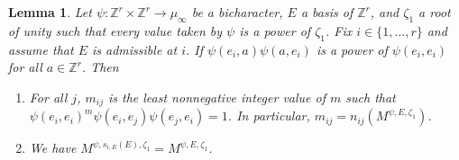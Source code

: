 \documentclass[11pt,letterpaper]{article}
\newtheorem{lemma}[theorem]{Lemma}
\theoremstyle{definition}
\theoremstyle{remark}
\numberwithin{equation}{section}
\theoremstyle{dotless}
\newcommand{\hchi}{\psi} %
\newcommand{\gene}{\zeta_1} %
\begin{document}
\begin{lemma}\label{kubota-bicharacter-identity} Let $\psi\colon \mathbb Z^r \times \mathbb Z^r \to \mu_\infty$ be a bicharacter, $E$ a basis of $\mathbb Z^r$, and $\gene$ a root of unity such that every value taken by $\psi$ is a power of $\gene$. Fix $i \in \{1,\dots, r\}$ and assume that $E$ is admissible at $i$.  If $\psi(e_i,a) \psi(a,e_i)$ is a power of $\psi(e_i,e_i)$ for all $a\in \mathbb Z^r$. Then

\begin{enumerate}
    \item  For all $j$, $m_{ij}$ is the least nonnegative integer value of $m$ such that $\hchi(e_i,e_i)^m \hchi(e_i,e_j) \hchi(e_j,e_i) =1$. In particular, $m_{ij}=n_{ij}(M^{\hchi, E, \gene})$.

    \item We have $M^{\hchi,s_{i,E}(E) , \gene} = M^{\hchi,E, \gene}$.

\end{enumerate}

\end{lemma}
\end{document}
